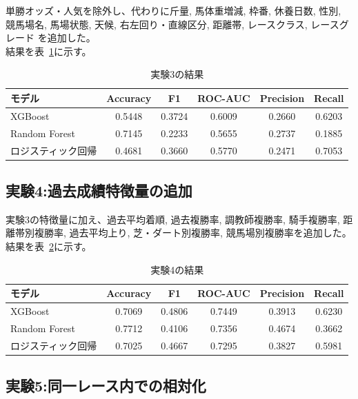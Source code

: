 \documentclass[dvipdfmx, a4paper, 11pt, titlepage]{jsarticle}
\begin{document}
単勝オッズ・人気を除外し、代わりに斤量, 馬体重増減, 枠番, 休養日数, 性別,
競馬場名, 馬場状態, 天候, 右左回り・直線区分, 距離帯, レースクラス, レースグレード
を追加した。\\
結果を表~\ref{tab:exp3}に示す。

\begin{table}[H]
  \centering
  \caption{実験3の結果}
  \label{tab:exp3}
  \begin{tabular}{lccccc}
    \toprule
    モデル & Accuracy & F1 & ROC-AUC & Precision & Recall \\
    \midrule
    XGBoost           & 0.5448 & 0.3724 & 0.6009 & 0.2660 & 0.6203 \\
    Random Forest     & 0.7145 & 0.2233 & 0.5655 & 0.2737 & 0.1885 \\
    ロジスティック回帰 & 0.4681 & 0.3660 & 0.5770 & 0.2471 & 0.7053 \\
    \bottomrule
  \end{tabular}
\end{table}

\subsection{実験4:過去成績特徴量の追加}

実験3の特徴量に加え、過去平均着順, 過去複勝率, 調教師複勝率, 騎手複勝率,
距離帯別複勝率, 過去平均上り, 芝・ダート別複勝率, 競馬場別複勝率を追加した。\\
結果を表~\ref{tab:exp4}に示す。

\begin{table}[H]
  \centering
  \caption{実験4の結果}
  \label{tab:exp4}
  \begin{tabular}{lccccc}
    \toprule
    モデル & Accuracy & F1 & ROC-AUC & Precision & Recall \\
    \midrule
    XGBoost           & 0.7069 & 0.4806 & 0.7449 & 0.3913 & 0.6230 \\
    Random Forest     & 0.7712 & 0.4106 & 0.7356 & 0.4674 & 0.3662 \\
    ロジスティック回帰 & 0.7025 & 0.4667 & 0.7295 & 0.3827 & 0.5981 \\
    \bottomrule
  \end{tabular}
\end{table}

\subsection{実験5:同一レース内での相対化}
\end{document}
